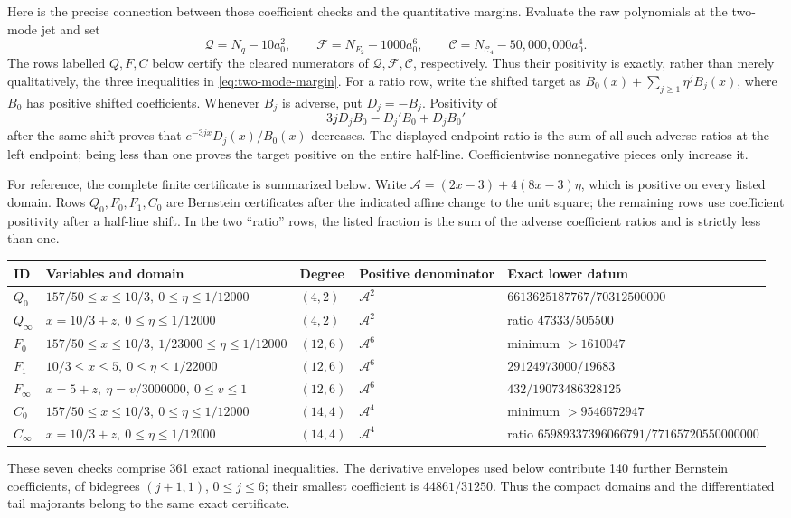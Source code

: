 \documentclass[11pt]{article}
\theoremstyle{remark}
\newcommand{\Cfour}{\mathcal{C}_4}
\numberwithin{equation}{section}
\begin{document}
Here is the precise connection between those coefficient checks and the
quantitative margins. Evaluate the raw polynomials at the two-mode jet and set
\[
 \mathcal Q=N_q-10a_0^2,
 \qquad \mathcal F=N_{F_2}-1000a_0^6,
 \qquad \mathcal C=N_{\Cfour}-50{,}000{,}000a_0^4.
\]
The rows labelled \(Q,F,C\) below certify the cleared numerators of
\(\mathcal Q,\mathcal F,\mathcal C\), respectively. Thus their positivity is
exactly, rather than merely qualitatively, the three inequalities in
\eqref{eq:two-mode-margin}. For a ratio row, write the shifted target as
\(B_0(x)+\sum_{j\geq1}\eta^jB_j(x)\), where \(B_0\) has positive shifted
coefficients. Whenever \(B_j\) is adverse, put \(D_j=-B_j\). Positivity of
\[
 3jD_jB_0-D_j'B_0+D_jB_0'
\]
after the same shift proves that
\(e^{-3jx}D_j(x)/B_0(x)\) decreases. The displayed endpoint ratio is the sum
of all such adverse ratios at the left endpoint; being less than one proves
the target positive on the entire half-line. Coefficientwise nonnegative
pieces only increase it.

For reference, the complete finite certificate is summarized below.  Write
\(\mathcal A=(2x-3)+4(8x-3)\eta\), which is positive on every listed domain.
Rows \(Q_0,F_0,F_1,C_0\) are Bernstein certificates after the indicated
affine change to the unit square; the remaining rows use coefficient
positivity after a half-line shift. In the two ``ratio'' rows, the listed
fraction is the sum of
the adverse coefficient ratios and is strictly less than one.
\begin{center}
\tiny
\begin{tabular}{@{}lllll@{}}
\toprule
ID & Variables and domain & Degree & Positive denominator & Exact lower datum \\
\midrule
\(Q_0\) & \(157/50\le x\le10/3,\ 0\le \eta\le1/12000\)
 & \((4,2)\) & \(\mathcal A^2\) & \(6613625187767/70312500000\) \\
\(Q_\infty\) & \(x=10/3+z,\ 0\le \eta\le1/12000\)
 & \((4,2)\) & \(\mathcal A^2\) & ratio \(47333/505500\) \\
\(F_0\) & \(157/50\le x\le10/3,\ 1/23000\le \eta\le1/12000\)
 & \((12,6)\) & \(\mathcal A^6\) & minimum \(>1610047\) \\
\(F_1\) & \(10/3\le x\le5,\ 0\le \eta\le1/22000\)
 & \((12,6)\) & \(\mathcal A^6\) & \(29124973000/19683\) \\
\(F_\infty\) & \(x=5+z,\ \eta=v/3000000,\ 0\leq v\leq1\)
 & \((12,6)\) & \(\mathcal A^6\) & \(432/19073486328125\) \\
\(C_0\) & \(157/50\le x\le10/3,\ 0\le \eta\le1/12000\)
 & \((14,4)\) & \(\mathcal A^4\) & minimum \(>9546672947\) \\
\(C_\infty\) & \(x=10/3+z,\ 0\le \eta\le1/12000\)
 & \((14,4)\) & \(\mathcal A^4\) & ratio \(65989337396066791/77165720550000000\) \\
\bottomrule
\end{tabular}
\end{center}
These seven checks comprise 361 exact rational inequalities.  The derivative
envelopes used below contribute 140 further Bernstein coefficients, of
bidegrees \((j+1,1)\), \(0\le j\le6\); their smallest coefficient is
\(44861/31250\).  Thus the compact domains and the differentiated tail
majorants belong to the same exact certificate.
\end{document}
